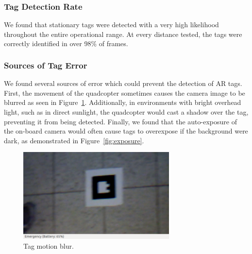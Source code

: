		\subsubsection{Tag Detection Rate}

			We found that stationary tags were detected with a very high likelihood throughout the entire operational range. At every distance tested, the tags were correctly identified in over 98\% of frames.

		\subsubsection{Sources of Tag Error}

			We found several sources of error which could prevent the detection of AR tags. First, the movement of the quadcopter sometimes causes the camera image to be blurred as seen in Figure~\ref{fig:tagblur}. Additionally, in environments with bright overhead light, such as in direct sunlight, the quadcopter would cast a shadow over the tag, preventing it from being detected. Finally, we found that the auto-exposure of the on-board camera would often cause tags to overexpose if the background were dark, as demonstrated in Figure~\ref{fig:exposure}.

			\begin{figure}[ht]
			        \centering
			        \includegraphics[width=300px]{../images/blur.png}
			        \caption{Tag motion blur.}\label{fig:tagblur}
			\end{figure}

